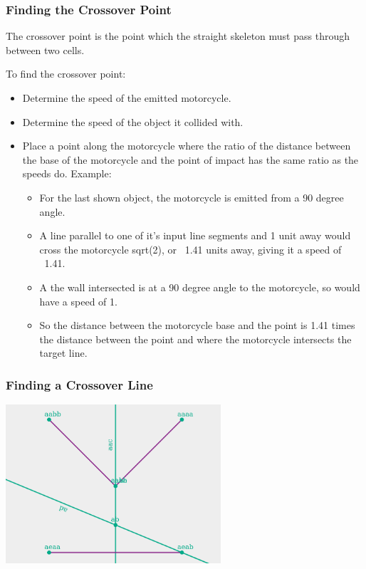 \documentclass[hyperref={pdfpagemode=FullScreen},aspectratio=169]{beamer}
\begin{document}
\begin{frame}
  \frametitle{Finding the Crossover Point}
  The crossover point is the point which the straight skeleton must pass through between two cells.\par
  To find the crossover point:
  \begin{itemize}
  \item Determine the speed of the emitted motorcycle.
  \item Determine the speed of the object it collided with.
  \item Place a point along the motorcycle where the ratio of the distance between the base of the motorcycle and the point of impact has the same ratio as the speeds do.
  Example:
    \begin{itemize}
    \item For the last shown object, the motorcycle is emitted from a 90 degree angle.
    \item A line parallel to one of it's input line segments and 1 unit away would cross the motorcycle sqrt(2), or ~1.41 units away, giving it a speed of ~1.41.
    \item A the wall intersected is at a 90 degree angle to the motorcycle, so would have a speed of 1.
    \item So the distance between the motorcycle base and the point is 1.41 times the distance between the point and where the motorcycle intersects the target line.
    \end{itemize}
  \end{itemize}
\end{frame}
    
\begin{frame}
  \frametitle{Finding a Crossover Line}
  \includegraphics[width=0.6\textwidth, center]{C3-motorcycle-left_line-nogrid.png}
\end{frame}
\end{document}
